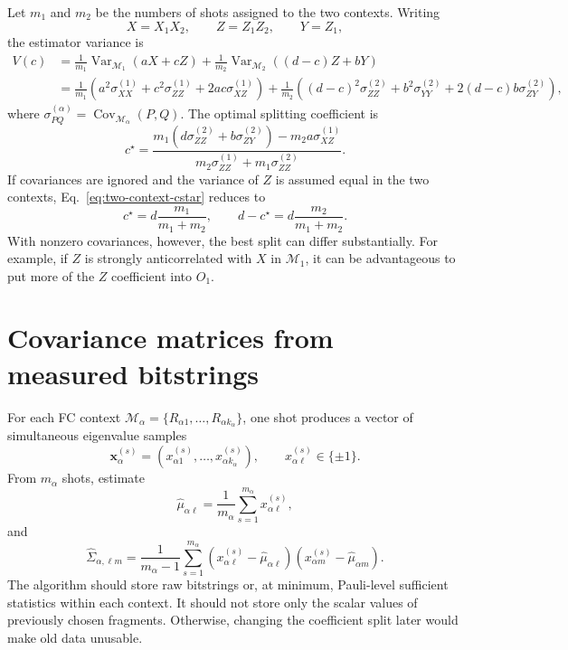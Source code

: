 \documentclass[11pt]{article}
\newcommand{\Var}{\operatorname{Var}}
\newcommand{\Cov}{\operatorname{Cov}}
\begin{document}
Let $m_1$ and $m_2$ be the numbers of shots assigned to the two contexts. Writing
\begin{equation}
    X=X_1X_2,
    \qquad
    Z=Z_1Z_2,
    \qquad
    Y=Z_1,
\end{equation}
the estimator variance is
\begin{align}
    V(c)
    &=
    \frac{1}{m_1}\Var_{\mathcal M_1}(aX+cZ)
    +
    \frac{1}{m_2}\Var_{\mathcal M_2}((d-c)Z+bY) \\
    &=
    \frac{1}{m_1}
    \left(a^2\sigma^{(1)}_{XX}+c^2\sigma^{(1)}_{ZZ}+2ac\sigma^{(1)}_{XZ}\right)
    +
    \frac{1}{m_2}
    \left((d-c)^2\sigma^{(2)}_{ZZ}+b^2\sigma^{(2)}_{YY}+2(d-c)b\sigma^{(2)}_{ZY}\right),
\end{align}
where $\sigma^{(\alpha)}_{PQ}=\Cov_{\mathcal M_\alpha}(P,Q)$. The optimal splitting coefficient is
\begin{equation}
    c^\star
    =
    \frac{
    m_1\left(d\sigma^{(2)}_{ZZ}+b\sigma^{(2)}_{ZY}\right)
    -
    m_2 a\sigma^{(1)}_{XZ}
    }{
    m_2\sigma^{(1)}_{ZZ}+m_1\sigma^{(2)}_{ZZ}
    }.
    \label{eq:two-context-cstar}
\end{equation}
If covariances are ignored and the variance of $Z$ is assumed equal in the two contexts, Eq.~\eqref{eq:two-context-cstar} reduces to
\begin{equation}
    c^\star = d\frac{m_1}{m_1+m_2},
    \qquad
    d-c^\star = d\frac{m_2}{m_1+m_2}.
\end{equation}
With nonzero covariances, however, the best split can differ substantially. For example, if $Z$ is strongly anticorrelated with $X$ in $\mathcal M_1$, it can be advantageous to put more of the $Z$ coefficient into $O_1$.

\section{Covariance matrices from measured bitstrings}

For each FC context $\mathcal M_\alpha=\{R_{\alpha 1},\ldots,R_{\alpha k_\alpha}\}$, one shot produces a vector of simultaneous eigenvalue samples
\begin{equation}
    \bm x_\alpha^{(s)} =
    \left(x_{\alpha 1}^{(s)},\ldots,x_{\alpha k_\alpha}^{(s)}\right),
    \qquad
    x_{\alpha\ell}^{(s)}\in\{\pm 1\}.
\end{equation}
From $m_\alpha$ shots, estimate
\begin{equation}
    \widehat\mu_{\alpha\ell}
    =
    \frac{1}{m_\alpha}\sum_{s=1}^{m_\alpha}x_{\alpha\ell}^{(s)},
\end{equation}
and
\begin{equation}
    \widehat\Sigma_{\alpha,\ell m}
    =
    \frac{1}{m_\alpha-1}\sum_{s=1}^{m_\alpha}
    \left(x_{\alpha\ell}^{(s)}-\widehat\mu_{\alpha\ell}\right)
    \left(x_{\alpha m}^{(s)}-\widehat\mu_{\alpha m}\right).
    \label{eq:empirical-covariance}
\end{equation}
The algorithm should store raw bitstrings or, at minimum, Pauli-level sufficient statistics within each context. It should not store only the scalar values of previously chosen fragments. Otherwise, changing the coefficient split later would make old data unusable.
\end{document}
